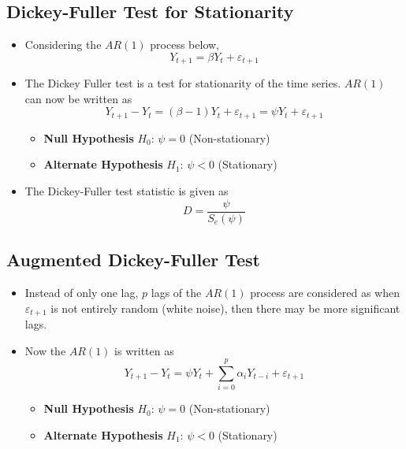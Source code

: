\documentclass{article}
\theoremstyle{plain}
\theoremstyle{definition}
\begin{document}
\subsection{Dickey-Fuller Test for Stationarity}
\begin{itemize}
    \item Considering the $AR(1)$ process below, 
    \begin{equation*}
        Y_{t+1} = \beta Y_t + \varepsilon_{t+1}
    \end{equation*}
    
    \item The Dickey Fuller test is a test for stationarity of the time series. $AR(1)$ can now be written as
    \begin{equation*}
        Y_{t+1} - Y_{t} = (\beta -1 ) Y_t + \varepsilon_{t+1} = \psi Y_t + \varepsilon_{t+1} 
    \end{equation*}
    \begin{itemize}
        \item \textbf{Null Hypothesis} $H_0$: $\psi = 0$ (Non-stationary)
    \item \textbf{Alternate Hypothesis} $H_1$: $\psi < 0$ (Stationary)
    \end{itemize}
    
    \item The Dickey-Fuller test statistic is given as
    \begin{equation*}
        D = \frac{\psi}{S_e(\psi)}
    \end{equation*}
\end{itemize}

\subsection{Augmented Dickey-Fuller Test}
\begin{itemize}
    \item Instead of only one lag, $p$ lags of the $AR(1)$ process are considered as when $\varepsilon_{t+1}$ is not entirely random (white noise), then there may be more significant lags. 
    
    \item Now the $AR(1)$ is written as
    \begin{equation*}
        Y_{t+1} - Y_{t} = \psi Y_t + \sum_{i=0}^p \alpha_i Y_{t-i} + \varepsilon_{t+1}
    \end{equation*}
    
    \begin{itemize}
        \item \textbf{Null Hypothesis} $H_0$: $\psi = 0$ (Non-stationary)
    \item \textbf{Alternate Hypothesis} $H_1$: $\psi < 0$ (Stationary)
    \end{itemize}
\end{itemize}
\end{document}

